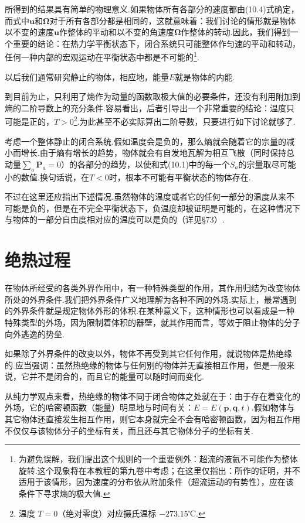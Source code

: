 所得到的结果具有简单的物理意义.如果物体所有各部分的速度都由(10.4)式确定，而式中$\boldsymbol{u}$和$\boldsymbol{\Omega}$对于所有各部分都是相同的，这就意味着：我们讨论的情形就是物体以不变的速度$\boldsymbol{u}$作整体的平动和以不变的角速度$\boldsymbol{\Omega}$作整体的转动.因此，我们得到一个重要的结论：在热力学平衡状态下，闭合系统只可能整体作匀速的平动和转动，任何一种内部的宏观运动在平衡状态中都是不可能的\footnote{为避免误解，我们提出这个规则的一个重要例外：超流的液氦不可能作为整体旋转.这个现象将在本教程的第九卷中考虑；在这里仅指出：所作的证明，并不适用于该情形，因为速度的分布依从附加条件（超流运动的有势性），应在该条件下寻求熵的极大值.}.

以后我们通常研究静止的物体，相应地，能量$E$就是物体的内能.

到目前为止，只利用了熵作为动量的函数取极大值的必要条件，还没有利用附加到熵的二阶导数上的充分条件.容易看出，后者引导出一个非常重要的结论：温度只可能是正的，$T>0$\footnote{温度 $T=0$（绝对零度）对应摄氏温标 $-273.15$℃.}.为此甚至不必实际算出二阶导数，只要进行如下讨论就够了.

考虑一个整体静止的闭合系统.假如温度会是负的，那么熵就会随着它的宗量的减小而增长.由于熵有增长的趋势，物体就会有自发地瓦解为相互飞散（同时保持总动量$\sum_a\boldsymbol{P}_a=0$）的各部分的趋势，以使和式(10.1)中的每一个$S_a$的宗量取尽可能小的数值.换句话说，在$T<0$时，根本不可能有平衡状态的物体存在.

不过在这里还应指出下述情况.虽然物体的温度或者它的任何一部分的温度从来不可能是负的，但是在不完全平衡状态下，负温度却被证明是可能的，在这种情况下与物体的一部分自由度相对应的温度可以是负的（详见§73）.

\section{绝热过程}

在物体所经受的各类外界作用中，有一种特殊类型的作用，其作用归结为改变物体所处的外界条件.我们把外界条件广义地理解为各种不同的外场.实际上，最常遇到的外界条件就是规定物体外形的体积.在某种意义下，这种情形也可以看成是一种特殊类型的外场，因为限制着体积的器壁，就其作用而言，等效于阻止物体的分子向外逃逸的势垒.

如果除了外界条件的改变以外，物体不再受到其它任何作用，就说物体是热绝缘的.应当强调：虽然热绝缘的物体与任何别的物体并无直接相互作用，但是一般来说，它并不是闭合的，而且它的能量可以随时间而变化.

从纯力学观点来看，热绝缘的物体不同于闭合物体之处就在于：由于存在着变化的外场，它的哈密顿函数（能量）明显地与时间有关：$E=E(\boldsymbol{p},\boldsymbol{q},t)$.假如物体与其它物体还直接发生相互作用，则它本身就完全不会有哈密顿函数，因为相互作用不仅仅与该物体分子的坐标有关，而且还与其它物体分子的坐标有关.

